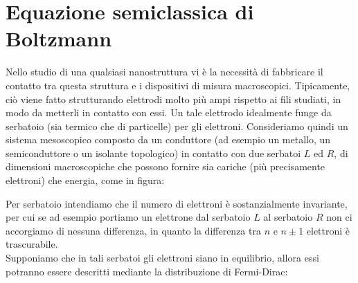 \section{Equazione semiclassica di Boltzmann}
Nello studio di una qualsiasi nanostruttura vi è la necessità di fabbricare il contatto tra questa struttura e i dispositivi di misura macroscopici. Tipicamente, ciò viene fatto strutturando elettrodi molto più ampi rispetto ai fili studiati, in modo da metterli in contatto con essi. Un tale elettrodo idealmente funge da serbatoio (sia termico che di particelle) per gli elettroni. Consideriamo quindi un sistema mesoscopico composto da un conduttore (ad esempio un metallo, un semiconduttore o un isolante topologico) in contatto con due serbatoi $L$ ed $R$, di dimensioni macroscopiche che possono fornire sia cariche (più precisamente elettroni) che energia, come in figura:
\begin{figure}[H]
   \centering
\end{figure}
\hspace{-0.6cm}Per serbatoio intendiamo che il numero di elettroni è sostanzialmente invariante, per cui se ad esempio portiamo un elettrone dal serbatoio $L$ al serbatoio $R$ non ci accorgiamo di nessuna differenza, in quanto la differenza tra $n$ e $n \pm 1$ elettroni è trascurabile.\\
Supponiamo che in tali serbatoi gli elettroni siano in equilibrio, allora essi potranno essere descritti mediante la distribuzione di Fermi-Dirac:
